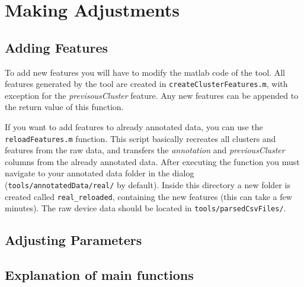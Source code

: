 \documentclass[a4paper, 11pt]{article}
\begin{document}
\section{Making Adjustments}

\subsection{Adding Features}

To add new features you will have to modify the matlab code of the tool. All features generated by the tool are created in \verb|createClusterFeatures.m|, with exception for the \emph{previsousCluster} feature. Any new features can be appended to the return value of this function. 

If you want to add features to already annotated data, you can use the \verb|reloadFeatures.m| function. This script basically recreates all clusters and features from the raw data, and transfers the \emph{annotation} and \emph{previousCluster} columns from the already annotated data. After executing the function you must navigate to your annotated data folder in the dialog (\verb|tools/annotatedData/real/| by default). Inside this directory a new folder is created called \verb|real_reloaded|, containing the new features (this can take a few minutes). The raw device data should be located in \verb|tools/parsedCsvFiles/|.

\subsection{Adjusting Parameters}

\subsection{Explanation of main functions}
\end{document}
